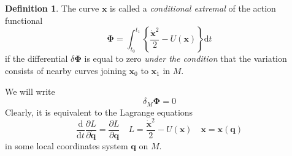 \documentclass[conference]{IEEEtran}
\theoremstyle{definition}
\newtheorem{definition}{Definition}[section]
\theoremstyle{remark}
\begin{document}
    \begin{definition}
        The curve $\mathbf{x}$ is called a \emph{conditional extremal} of the action functional
        \begin{equation*}
            \bm{\Phi} = \int_{t_0}^{t_1} \left\{ \dfrac{\dot{\mathbf{x}}^2}{2} - U(\mathbf{x}) \right\} \mathrm{d} t
        \end{equation*}
        if the differential $\delta \bm{\Phi}$ is equal to zero \emph{under the condition} that the variation consists of nearby curves joining $\mathbf{x}_0$ to $\mathbf{x}_1$ in $M$.
    \end{definition}
    We will write
    \begin{equation*}
        \delta_M \bm{\Phi} = 0
    \end{equation*}
    Clearly, it is equivalent to the Lagrange equations
    \begin{equation*}
        \dfrac{\mathrm{d}}{\mathrm{d} t} \dfrac{\partial L}{\partial \dot{\mathbf{q}}} = \dfrac{\partial L}{\partial \mathbf{q}} \quad L = \dfrac{\dot{\mathbf{x}}^2}2 - U(\mathbf{x}) \quad \mathbf{x} = \mathbf{x}(\mathbf{q})
    \end{equation*}
    in some local coordinates system $\mathbf{q}$ on $M$.
\end{document}
